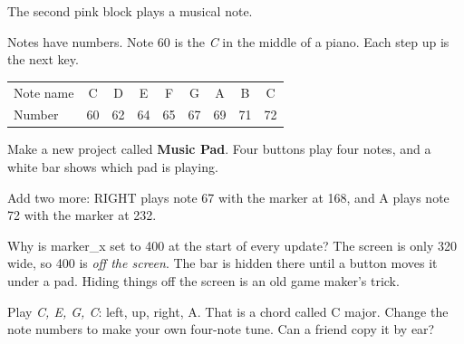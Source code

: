 The second pink block plays a musical note.


Notes have numbers. Note 60 is the \emph{C} in the middle of a piano. Each step
up is the next key.

\begin{center}
\begin{tabular}{@{}lcccccccc@{}}
\toprule
Note name & C & D & E & F & G & A & B & C \\
Number & 60 & 62 & 64 & 65 & 67 & 69 & 71 & 72 \\
\bottomrule
\end{tabular}
\end{center}

\begin{prgmission}
Make a new project called \textbf{Music Pad}. Four buttons play four notes,
and a white bar shows which pad is playing.



Add two more: RIGHT plays note 67 with the marker at 168, and A plays note 72
with the marker at 232.

\end{prgmission}

Why is marker\_x set to 400 at the start of every update? The screen is only
320 wide, so 400 is \emph{off the screen}. The bar is hidden there until a
button moves it under a pad. Hiding things off the screen is an old game
maker's trick.

\begin{prgtry}
Play \emph{C, E, G, C}: left, up, right, A. That is a chord called C major.
Change the note numbers to make your own four-note tune. Can a friend copy it
by ear?
\end{prgtry}

